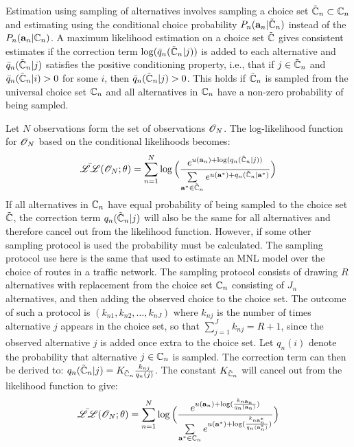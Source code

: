 Estimation using sampling of alternatives involves sampling a choice set $\tilde{\mathbb{C}}_n \subset \mathbb{C}_n$ and estimating using the conditional choice probability $P_n({\bf a}_n|\tilde{\mathbb{C}}_n)$ instead of the $P_n({\bf a}_n|\mathbb{C}_n)$. A maximum likelihood estimation on a choice set $\tilde{\mathbb{C}}$ gives consistent estimates if the correction term $\log(\bar{q}_n(\tilde{\mathbb{C}}_n|j))$ is added to each alternative and $\bar{q}_n(\tilde{\mathbb{C}}_n|j)$ satisfies the positive conditioning property, i.e., that if $j\in \tilde{\mathbb{C}}_n$ and $\bar{q}_n(\tilde{\mathbb{C}}_n|i)>0$ for some $i$, then $\bar{q}_n(\tilde{\mathbb{C}}_n|j)>0$. This holds if $\tilde{\mathbb{C}}_n$ is sampled from the universal choice set $\mathbb{C}_n$ and all alternatives in $\mathbb{C}_n$ have a non-zero probability of being sampled.

Let $N$ observations form the set of observations $\mathscr{O}_N$. The log-likelihood function for $\mathscr{O}_N$ based on the conditional likelihoods becomes:
\begin{equation} \label{eq:cond_like}
\bar{\LL}(\obs_N;\theta) = \sum_{n=1}^N \log \Bl \frac{e^{u(\ve{a}_n) + \log(q_n(\Ccsamp_n|j))}}{\sum\limits_{\ve{a}^* \in \Ccsamp_n} e^{u(\ve{a}^*) + q_n(\Ccsamp_n|\ve{a}^*)}}\Bh
\end{equation}
If all alternatives in $\mathbb{C}_n$ have equal probability of being sampled to the choice set $\tilde{\mathbb{C}}$, the correction term $q_n(\tilde{\mathbb{C}}_n|j)$ will also be the same for all alternatives and therefore cancel out from the likelihood function. However, if some other sampling protocol is used the probability must be calculated. The sampling protocol use here is the same that \citet{frejinger09} used to estimate an MNL model over the choice of routes in a traffic network. The sampling protocol consists of drawing $R$ alternatives with replacement from the choice set $\mathbb{C}_n$ consisting of $J_n$ alternatives, and then adding the observed choice to the choice set. The outcome of such a protocol is $({k}_{n1},{k}_{n2},\dots,{k}_{nJ})$ where ${k}_{nj}$ is the number of times alternative $j$ appears in the choice set, so that $\sum_{j=1}^J {k}_{nj} = R+1$, since the observed alternative $j$ is added once extra to the choice set. Let $q_n(i)$ denote the probability that alternative $j \in \mathbb{C}_n$ is sampled. The correction term can then be derived to: $q_n(\tilde{\mathbb{C}}_n|j) = K_{\tilde{\mathbb{C}}_n}\frac{k_{nj}}{q_n(j)}$. The constant $K_{\tilde{\mathbb{C}}_n}$ will cancel out from the likelihood function to give:
\begin{equation} \label{eq:cond_like_corr}
\bar{\LL}(\obs_N;\theta) = \sum_{n=1}^N \log \Bl \frac{e^{u(\ve{a}_n) + \log(\frac{k_{n\ve{a}_n}}{q_n(\ve{a}_n)})}}{\sum\limits_{\ve{a}^* \in \Cc_n} e^{u(\ve{a}^*) + \log(\frac{k_{n\ve{a}^*_n}}{q_n(\ve{a}^*_n)})}}\Bh
\end{equation}
 
